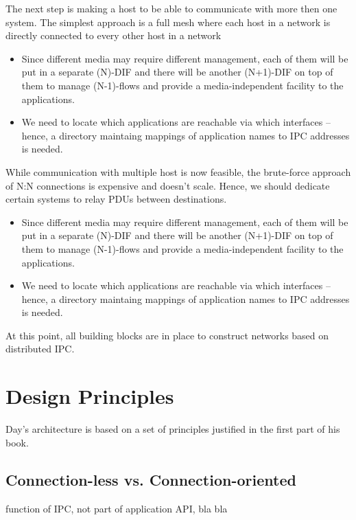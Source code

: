         The next step is making a host to be able to communicate with more then one system. The simplest approach is a full mesh where each host in a network is directly connected to every other host in a network

        \begin{itemize}
        \item Since different media may require different management, each of them will be put in a separate (N)-DIF and there will be another (N+1)-DIF on top of them to manage (N-1)-flows and provide a media-independent facility to the applications.
        \item We need to locate which applications are reachable via which interfaces -- hence, a directory maintaing mappings of application names to IPC addresses is needed.
        \end{itemize}

        While communication with multiple host is now feasible, the brute-force approach of N:N connections is expensive and doesn't scale. Hence, we should dedicate certain systems to relay PDUs between destinations.

        \begin{itemize}
        \item Since different media may require different management, each of them will be put in a separate (N)-DIF and there will be another (N+1)-DIF on top of them to manage (N-1)-flows and provide a media-independent facility to the applications.
        \item We need to locate which applications are reachable via which interfaces -- hence, a directory maintaing mappings of application names to IPC addresses is needed.
        \end{itemize}

        At this point, all building blocks are in place to construct networks based on distributed IPC.

    \section{Design Principles}
        Day's architecture is based on a set of principles justified in the first part of his book.

        \subsection{Connection-less vs. Connection-oriented}
            function of IPC, not part of application API, bla bla

